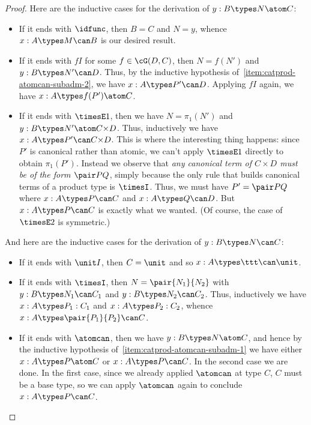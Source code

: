 \begin{proof}
  Here are the inductive cases for the derivation of $y:B\types N\atom C$:
  \begin{itemize}
  \item If it ends with $\idfunc$, then $B=C$ and $N=y$, whence $x:A\types M\can B$ is our desired result.
  \item If it ends with $fI$ for some $f\in\cG(D,C)$, then $N=f(N')$ and $y:B\types N'\can D$.
    Thus, by the inductive hypothesis of~\ref{item:catprod-atomcan-subadm-2}, we have $x:A\types P'\can D$.
    Applying $fI$ again, we have $x:A\types f(P')\atom C$.
  \item If it ends with $\timesE1$, then we have $N=\pi_1(N')$ and $y:B\types N'\atom C\times D$.
    Thus, inductively we have $x:A\types P'\can C\times D$.
    This is where the interesting thing happens: since $P'$ is canonical rather than atomic, we can't apply $\timesE1$ directly to obtain $\pi_1(P')$.
    Instead we observe that \emph{any canonical term of $C\times D$ must be of the form $\pair PQ$}, simply because the only rule that builds canonical terms of a product type is $\timesI$.
    Thus, we must have $P'=\pair PQ$ where $x:A\types P\can C$ and $x:A\types Q\can D$.
    But $x:A\types P\can C$ is exactly what we wanted.
    (Of course, the case of $\timesE2$ is symmetric.)
  \end{itemize}
  And here are the inductive cases for the derivation of $y:B\types N\can C$:
  \begin{itemize}
  \item If it ends with $\unit I$, then $C=\unit$ and so $x:A\types \ttt\can \unit$.
  \item If it ends with $\timesI$, then $N=\pair{N_1}{N_2}$ with $y:B\types N_1\can C_1$ and $y:B\types N_2\can C_2$.
    Thus, inductively we have $x:A\types P_1:C_1$ and $x:A\types P_2:C_2$, whence $x:A\types \pair{P_1}{P_2}\can C$.
  \item If it ends with $\atomcan$, then we have $y:B\types N\atom C$, and hence by the inductive hypothesis of~\ref{item:catprod-atomcan-subadm-1} we have either $x:A\types P\atom C$ or $x:A\types P\can C$.
    In the second case we are done.
    In the first case, since we already applied $\atomcan$ at type $C$, $C$ must be a base type, so we can apply $\atomcan$ again to conclude $x:A\types P\can C$.\qedhere
  \end{itemize}
\end{proof}

